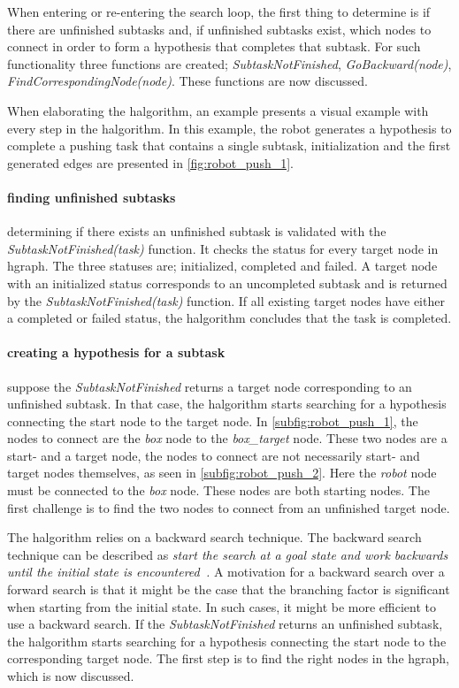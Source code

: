 When entering or re-entering the search loop, the first thing to determine is if there are unfinished subtasks and, if unfinished subtasks exist, which nodes to connect in order to form a hypothesis that completes that subtask. For such functionality three functions are created; \textit{SubtaskNotFinished}, \textit{GoBackward(\gls{node})}, \textit{FindCorrespondingNode(\gls{node})}. These functions are now discussed.\bs

When elaborating the \ac{halgorithm}, an example presents a visual example with every step in the \ac{halgorithm}. In this example, the robot generates a hypothesis to complete a pushing task that contains a single subtask, initialization and the first generated edges are presented in \cref{fig:robot_push_1}.\bs

\paragraph{finding unfinished subtasks}
determining if there exists an unfinished subtask is validated with the \textit{SubtaskNotFinished(\gls{task})} function. It checks the status for every target node in \ac{hgraph}. The three statuses are; initialized, completed and failed. A target node with an initialized status corresponds to an uncompleted subtask and is returned by the \textit{SubtaskNotFinished(\gls{task})} function. If all existing target nodes have either a completed or failed status, the \ac{halgorithm} concludes that the task is completed.\bs

\paragraph{creating a hypothesis for a subtask}
suppose the \textit{SubtaskNotFinished} returns a target node corresponding to an unfinished subtask. In that case, the \ac{halgorithm} starts searching for a hypothesis connecting the start node to the target node. In \cref{subfig:robot_push_1}, the nodes to connect are the \textit{box} node to the \textit{box\_target} node. These two nodes are a start- and a target node, the nodes to connect are not necessarily start- and target nodes themselves, as seen in \cref{subfig:robot_push_2}. Here the \textit{robot} node must be connected to the \textit{box} node. These nodes are both starting nodes. The first challenge is to find the two nodes to connect from an unfinished target node.\bs

 The \ac{halgorithm} relies on a backward search technique. The backward search technique can be described as \textit{start the search at a goal state and work backwards until the initial state is encountered~\cite{lavalle_planning_2006}.} A motivation for a backward search over a forward search is that it might be the case that the branching factor is significant when starting from the initial state. In such cases, it might be more efficient to use a backward search. If the \textit{SubtaskNotFinished} returns an unfinished subtask, the \ac{halgorithm} starts searching for a hypothesis connecting the start node to the corresponding target node. The first step is to find the right nodes in the \ac{hgraph}, which is now discussed.\bs

